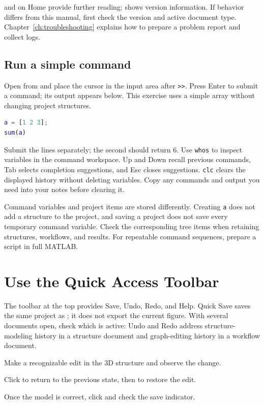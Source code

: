  and  on Home provide further reading;  shows version information. If behavior differs from this manual, first check the version and active document type. Chapter~\ref{ch:troubleshooting} explains how to prepare a problem report and collect logs.

\subsection{Run a simple command}

Open  from  and place the cursor in the input area after \texttt{>>}. Press Enter to submit a command; its output appears below. This exercise uses a simple array without changing project structures.

\begin{lstlisting}[language=Matlab]
a = [1 2 3];
sum(a)
\end{lstlisting}

Submit the lines separately; the second should return 6. Use \texttt{whos} to inspect variables in the command workspace. Up and Down recall previous commands, Tab selects completion suggestions, and Esc closes suggestions. \texttt{clc} clears the displayed history without deleting variables. Copy any commands and output you need into your notes before clearing it.

Command variables and project items are stored differently. Creating \texttt{a} does not add a structure to the project, and saving a project does not save every temporary command variable. Check the corresponding tree items when retaining structures, workflows, and results. For repeatable command sequences, prepare a script in full MATLAB\regmark{}.

\section{Use the Quick Access Toolbar}

The toolbar at the top provides Save, Undo, Redo, and Help. Quick Save saves the same project as ; it does not export the current figure. With several documents open, check which is active: Undo and Redo address structure-modeling history in a structure document and graph-editing history in a workflow document.

\begin{steps}
\item Make a recognizable edit in the 3D structure and observe the change.
\item Click  to return to the previous state, then  to restore the edit.
\item Once the model is correct, click  and check the save indicator.
\end{steps}

